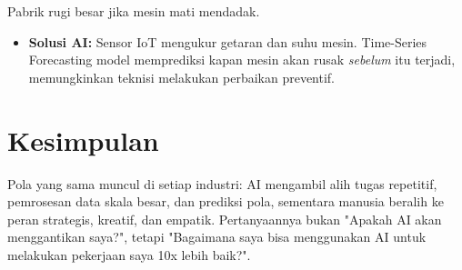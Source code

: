 Pabrik rugi besar jika mesin mati mendadak.
\begin{itemize}
    \item \textbf{Solusi AI:} Sensor IoT mengukur getaran dan suhu mesin. Time-Series Forecasting model memprediksi kapan mesin akan rusak \textit{sebelum} itu terjadi, memungkinkan teknisi melakukan perbaikan preventif.
\end{itemize}

\section{Kesimpulan}

Pola yang sama muncul di setiap industri: AI mengambil alih tugas repetitif, pemrosesan data skala besar, dan prediksi pola, sementara manusia beralih ke peran strategis, kreatif, dan empatik. Pertanyaannya bukan "Apakah AI akan menggantikan saya?", tetapi "Bagaimana saya bisa menggunakan AI untuk melakukan pekerjaan saya 10x lebih baik?".
